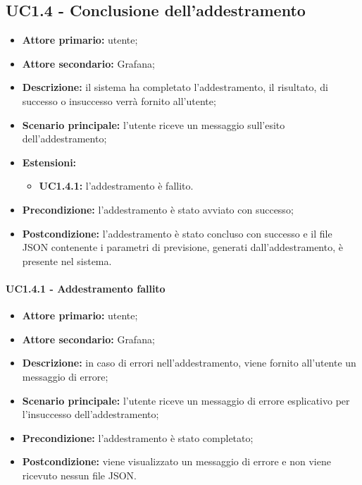 \documentclass{article}
\begin{document}
	\subsection{UC1.4 - Conclusione dell'addestramento}
	\begin{itemize}
		\item \textbf{Attore primario:} utente;
		\item \textbf{Attore secondario:} Grafana;
		\item \textbf{Descrizione:} il sistema ha completato l'addestramento, il risultato, di successo o insuccesso verrà fornito all'utente;
		\item \textbf{Scenario principale:} l'utente riceve un messaggio sull'esito dell'addestramento;
		\item \textbf{Estensioni:}
			\begin{itemize}
				\item \textbf{UC1.4.1:} l'addestramento è fallito.
			\end{itemize}
		\item \textbf{Precondizione:} l'addestramento è stato avviato con successo;
		\item \textbf{Postcondizione:} l'addestramento è stato concluso con successo e il file JSON contenente i parametri di previsione, generati dall'addestramento, è presente nel sistema.
	\end{itemize}

	\paragraph{UC1.4.1 - Addestramento fallito}
	\begin{itemize}
		\item \textbf{Attore primario:} utente;
		\item \textbf{Attore secondario:} Grafana;
		\item \textbf{Descrizione:} in caso di errori nell'addestramento, viene fornito all'utente un messaggio di errore;
		\item \textbf{Scenario principale:} l'utente riceve un messaggio di errore esplicativo per l'insuccesso dell'addestramento;
		\item \textbf{Precondizione:} l'addestramento è stato completato;
		\item \textbf{Postcondizione:} viene visualizzato un messaggio di errore e non viene ricevuto nessun file JSON.
	\end{itemize}
\end{document}
